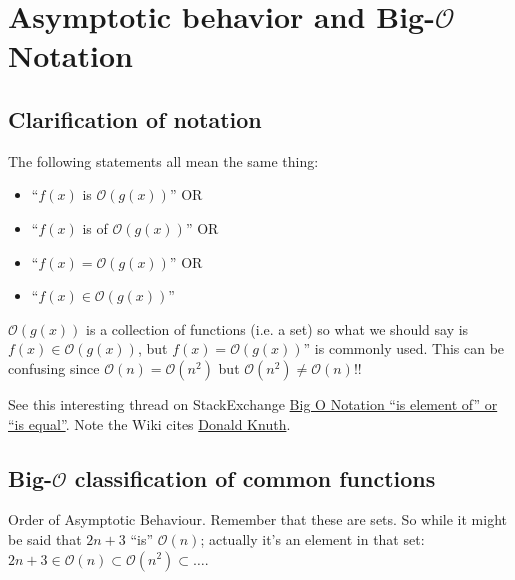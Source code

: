 \documentclass{exam}
\begin{document}
\section*{Asymptotic behavior and Big-$\mathcal{O}$ Notation}

\subsection*{Clarification of notation}
The following statements all mean the same thing:
    \begin{itemize}
        \item[] “$f(x)$ is $\mathcal{O}(g(x))$” OR  
        \item[] “$f(x)$ is of $\mathcal{O}(g(x))$” OR 
        \item[] “$f(x)=\mathcal{O}(g(x))$” OR
        \item[] “$f(x)\in \mathcal{O}(g(x))$” 
    \end{itemize}
    
$\mathcal{O}(g(x))$ is a collection of functions (i.e. a set) so what we should say is $f(x)\in \mathcal{O}(g(x))$, but $f(x)=\mathcal{O}(g(x))$” is commonly used. This can be confusing since $\mathcal{O}(n)=\mathcal{O}(n^{2})$ but $\mathcal{O}(n^{2})\neq \mathcal{O}(n)$!!

See this interesting thread on StackExchange \href{https://math.stackexchange.com/questions/2066004/big-o-notation-is-element-of-or-is-equal}{Big O Notation “is element of” or “is equal”}. Note the Wiki cites \href{https://en.wikipedia.org/wiki/Donald_Knuth}{Donald Knuth}.

\subsection*{Big-$\mathcal{O}$ classification of common functions}
Order of Asymptotic Behaviour. Remember that these are sets. So while it might be said that $2n+3$ “is” $\mathcal{O}(n)$; actually it’s an element in that set: $2n+3\in \mathcal{O}(n) \subset \mathcal{O}(n^{2})\subset \dots$.
\end{document}
